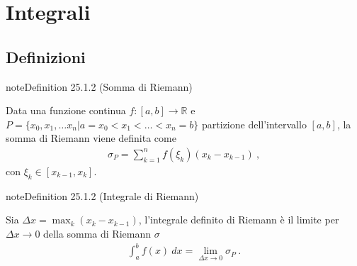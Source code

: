 \documentclass[letterpaper,10pt,italian]{jupyterBook}
\begin{document}
\chapter{Integrali}
\label{\detokenize{ch/infinitesimal_calculus/integrals:integrali}}\label{\detokenize{ch/infinitesimal_calculus/integrals:infinitesimal-calculus-integrals}}\label{\detokenize{ch/infinitesimal_calculus/integrals::doc}}

\section{Definizioni}
\label{\detokenize{ch/infinitesimal_calculus/integrals:definizioni}}\label{\detokenize{ch/infinitesimal_calculus/integrals:infinitesimal-calculus-integrals-def}}\label{ch/infinitesimal_calculus/integrals:infinitesimal-calculus:integrals:def:riemann-sum}
\begin{sphinxadmonition}{note}{Definition 25.1.2 (Somma di Riemann)}



\sphinxAtStartPar
Data una funzione continua \(f: [a,b] \rightarrow \mathbb{R}\) e \(P = \{ x_0, x_1, \dots x_n | a = x_0 < x_1 < \dots < x_n = b \}\) partizione dell’intervallo \([a,b]\), la somma di Riemann viene definita come
\begin{equation}\label{equation:ch/infinitesimal_calculus/integrals:infinitesimal-calculus:integrals:riemann:sum}
\begin{split}\sigma_P = \sum_{k=1}^{n} f(\xi_k) (x_{k} - x_{k-1}) \ ,\end{split}
\end{equation}
\sphinxAtStartPar
con \(\xi_k \in [x_{k-1}, x_k]\).
\end{sphinxadmonition}
\label{ch/infinitesimal_calculus/integrals:infinitesimal-calculus:integrals:def:riemann-sum}
\begin{sphinxadmonition}{note}{Definition 25.1.2 (Integrale di Riemann)}



\sphinxAtStartPar
Sia \(\Delta x = \max_k (x_{k} - x_{k-1})\), l’integrale definito di Riemann è  il limite per \(\Delta x \rightarrow 0\) della somma di Riemann \(\sigma\)
\begin{equation}\label{equation:ch/infinitesimal_calculus/integrals:infinitesimal-calculus:integrals:riemann:def}
\begin{split}\int_a^b f(x) \ dx = \lim_{\Delta x \rightarrow 0} \sigma_P \ .\end{split}
\end{equation}\end{sphinxadmonition}
\end{document}
